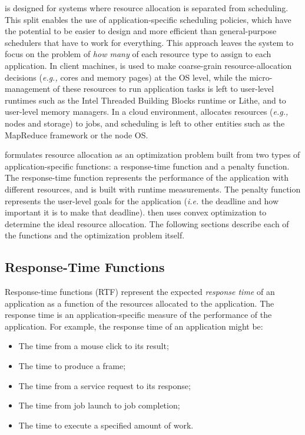 \pacora is designed for systems where resource allocation is separated
from scheduling.  This split enables the use of application-specific
scheduling policies, which have the potential to be easier to design
and more efficient than general-purpose schedulers that have to work
for everything.  This approach leaves the system to focus on the
problem of \emph{how many} of each resource type to assign to each
application.  In client machines, \pacora is used to make coarse-grain
resource-allocation decisions (\emph{e.g.,} cores and memory pages) at
the OS level, while the micro-management of these resources to run
application tasks is left to user-level runtimes such as the Intel
Threaded Building Blocks runtime\cite{CoMa08} or Lithe\cite{lithe},
and to user-level memory managers.  In a cloud environment, \pacora
allocates resources (\emph{e.g.,} nodes and storage) to jobs, and
scheduling is left to other entities such as the MapReduce
framework\cite{mapreduce} or the node OS.

\pacora formulates resource allocation as an optimization problem
built from two types of application-specific functions: a
response-time function and a penalty function. The response-time
function represents the performance of the application with different
resources, and is built with runtime measurements.  The penalty
function represents the user-level goals for the application
(\emph{i.e.} the deadline and how important it is to make that
deadline). \pacora then uses convex optimization\cite{BoVa} to
determine the ideal resource allocation.  The following sections
describe each of the functions and the optimization problem itself.

\subsection*{Response-Time Functions}

Response-time functions (RTF) represent the expected \emph{response
  time} of an application as a function of the resources allocated to
the application. The response time is an application-specific measure
of the performance of the application.  For example, the response time
of an application might be:
    \begin{itemize}\itemsep0pt \parskip0pt 
    \item The time from a mouse click to its result;
    \item The time to produce a frame;
    \item The time from a service request to its response;
    \item The time from job launch to job completion;
    \item The time to execute a specified amount of work.
    \end{itemize}

